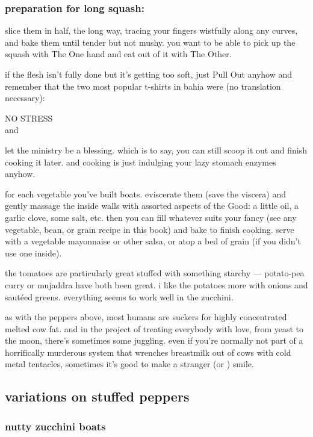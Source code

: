 \subsubsection{preparation for long squash:}
slice them in half, the long way, tracing your fingers wistfully along any 
curves, and bake them until tender but not mushy. you want to be able to pick 
up the squash with The One hand and eat out of it with The Other.

if the flesh isn't fully done but it's getting too soft, just Pull Out anyhow 
and remember that the two most popular t-shirts in bahia were (no translation 
necessary):

\mbox{\hskip2cm}\textsf{NO STRESS}\\
\mbox{\hskip1cm}and\\
\mbox{\hskip2cm}\textsf{}

let the ministry be a blessing. which is to say, you can still scoop it out 
and finish cooking it later. and cooking is just indulging your lazy stomach 
enzymes anyhow. 

for each vegetable you've built boats. eviscerate them (save the viscera) and 
gently massage the inside walls with assorted aspects of the Good: a little 
oil, a garlic clove, some salt, etc. then you can fill whatever suits your 
fancy (see any vegetable, bean, or grain recipe in this book) and bake to 
finish cooking. serve with a vegetable mayonnaise or other salsa, or atop a 
bed of grain (if you didn't use one inside).

the tomatoes are particularly great stuffed with something starchy --- 
potato-pea curry or \gls{mujaddra} have both been 
great. i like the potatoes more with onions and saut\'{e}ed greens. everything 
seems to work well in the zucchini.

as with the peppers above, most humans are suckers for highly concentrated 
melted cow fat. and in the project of treating everybody with love, from yeast 
to the moon, there's sometimes some juggling. even if you're normally not part 
of a horrifically murderous system that wrenches breastmilk out of cows with 
cold metal tentacles, sometimes it's good to make a stranger (or ) smile.

\subsection{variations on stuffed peppers}

\subsubsection{nutty zucchini boats}

